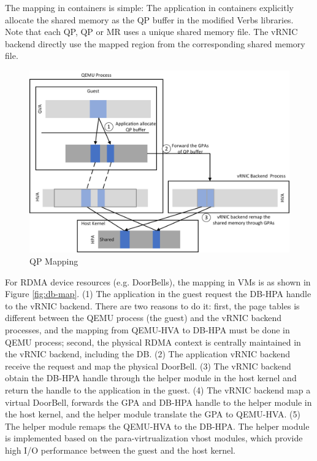 The mapping in containers is simple: The application in containers explicitly allocate the shared memory as the QP buffer in the modified Verbs libraries. Note that each QP, QP or MR uses a unique shared memory file. The vRNIC backend directly use the mapped region from the corresponding shared memory file.

\begin{figure}[!ht]
	\centering
	\includegraphics[width=1\linewidth]{images/qp-map.png}
	\caption{QP Mapping}
	\label{fig:qp-map}
\end{figure}

For RDMA device resources (e.g. DoorBells), the mapping in VMs is as shown in  Figure \ref{fig:db-map}. (1) The application in the guest request the DB-HPA handle to the vRNIC backend. There are two reasons to do it: first, the page tables is different between the QEMU process (the guest) and the vRNIC backend processes, and the mapping from QEMU-HVA to DB-HPA must be done in QEMU process; second, the physical RDMA context is centrally maintained in the vRNIC backend, including the DB. (2) The application vRNIC backend receive the request and map the physical DoorBell. (3) The vRNIC backend obtain the DB-HPA handle through the helper module in the host kernel and return the handle to the application in the guest. (4) The vRNIC backend map a virtual DoorBell, forwards the GPA and DB-HPA handle to the helper module in the host kernel, and the helper module translate the GPA to QEMU-HVA. (5) The helper module remaps the QEMU-HVA to the DB-HPA. The helper module is implemented based on the para-virtrualization vhost modules, which provide high I/O performance  between the guest and the host kernel.

